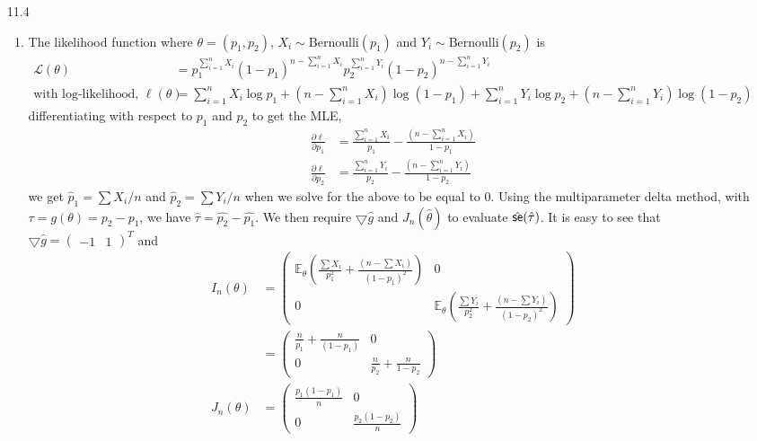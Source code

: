 \documentclass[a4paper,10pt]{article}
\theoremstyle{definition}
\begin{document}
\begin{enumerate}
\item[11.4]
\begin{enumerate}
\item The likelihood function where $\theta = (p_1, p_2)$, $X_i \sim \text{Bernoulli}(p_1)$  and $Y_i \sim \text{Bernoulli}(p_2)$ is 
\begin{align*}
\mathcal{L}(\theta)&=p_1^{\sum_{i=1}^{n} X_i}(1-p_1)^{n - \sum_{i=1}^{n} X_i}p_2^{\sum_{i=1}^{n} Y_i}(1-p_2)^{n-\sum_{i=1}^{n} Y_i}\\
\text{with log-likelihood, } \ell(\theta) &=\sum_{i=1}^{n} X_i \log p_1 + \left(n - \sum_{i=1}^{n} X_i\right) \log (1-p_1) +\sum_{i=1}^{n} Y_i \log p_2 + \left(n - \sum_{i=1}^{n} Y_i\right) \log (1-p_2)
\end{align*}
differentiating with respect to $p_1$ and $p_2$ to get the {\sffamily MLE},
\begin{align*}
\frac{\partial \ell}{\partial p_1} &= \frac{\sum_{i=1}^{n} X_i}{p_1} - \frac{\left(n - \sum_{i=1}^{n} X_i\right)}{1-p_1}\\
\frac{\partial \ell}{\partial p_2} &= \frac{\sum_{i=1}^{n} Y_i}{p_2} - \frac{\left(n - \sum_{i=1}^{n} Y_i\right)}{1-p_2}
\end{align*}
we get $\hat{p}_1 = \sum X_i /n$ and $\hat{p}_2 = \sum Y_i /n$ when we solve for the above to be equal to 0. Using the multiparameter delta method, with $\tau = g(\theta) = p_2-p_1$, we have $\hat{\tau} = \hat{p_2} - \hat{p_1}$. We then require $\bigtriangledown \hat{g}$ and $J_n(\hat{\theta})$ to evaluate $\hat{\text{\sffamily se}}(\hat{\tau})$. It is easy to see that $\bigtriangledown \hat{g} = \begin{pmatrix}-1 & 1\end{pmatrix}^T$ and 
\begin{align*}
I_n(\theta) &= \begin{pmatrix} \mathbb{E}_{\theta}\left(\frac{\sum X_i}{p_1^2}+\frac{\left(n - \sum X_i\right)}{(1-p_1)^2}\right) & 0 \\ 0 & \mathbb{E}_{\theta}\left(\frac{\sum Y_i}{p_2^2}+\frac{\left(n - \sum Y_i\right)}{(1-p_2)^2}\right)\end{pmatrix}\\
&= \begin{pmatrix} \frac{n}{p_1}+\frac{n}{(1-p_1)} & 0 \\ 0 & \frac{n}{p_2}+\frac{n}{1-p_2}\end{pmatrix}\\
J_n(\theta) &= \begin{pmatrix} \frac{p_1(1-p_1)}{n} & 0 \\ 0 & \frac{p_2(1-p_2)}{n}\end{pmatrix}

\end{align*}
\end{enumerate}
\end{enumerate}
\end{document}
